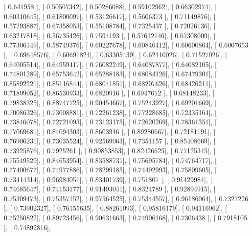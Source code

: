 \documentclass{article}
\begin{document}
       [ 0.641958  ],
       [ 0.50507342],
       [ 0.50286088],
       [ 0.59102962],
       [ 0.66302974],
       [ 0.60310645],
       [ 0.61800097],
       [ 0.53126617],
       [ 0.5606373 ],
       [ 0.71149876],
       [ 0.57293887],
       [ 0.67358053],
       [ 0.55108784],
       [ 0.7325437 ],
       [ 0.72026136],
       [ 0.63217818],
       [ 0.56735426],
       [ 0.7594193 ],
       [ 0.57612146],
       [ 0.67308009],
       [ 0.77306149],
       [ 0.58749376],
       [ 0.60227678],
       [ 0.60846412],
       [ 0.60600864],
       [ 0.6007653 ],
       [ 0.69648576],
       [ 0.60691824],
       [ 0.63305439],
       [ 0.62110026],
       [ 0.71527026],
       [ 0.64005514],
       [ 0.64959417],
       [ 0.76082249],
       [ 0.64087877],
       [ 0.64082105],
       [ 0.74801289],
       [ 0.65753642],
       [ 0.65288183],
       [ 0.68084126],
       [ 0.67479301],
       [ 0.85892221],
       [ 0.85116844],
       [ 0.68041851],
       [ 0.68207626],
       [ 0.68426211],
       [ 0.71899052],
       [ 0.86530933],
       [ 0.6820916 ],
       [ 0.6947612 ],
       [ 0.68148233],
       [ 0.79838325],
       [ 0.88747725],
       [ 0.90454667],
       [ 0.75243927],
       [ 0.69201669],
       [ 0.70086326],
       [ 0.73008881],
       [ 0.72261238],
       [ 0.77228685],
       [ 0.72335164],
       [ 0.73846078],
       [ 0.72721093],
       [ 0.73123175],
       [ 0.72620269],
       [ 0.78361351],
       [ 0.77069681],
       [ 0.84094303],
       [ 0.8603946 ],
       [ 0.89280667],
       [ 0.72181191],
       [ 0.76906231],
       [ 0.73035524],
       [ 0.92569063],
       [ 0.7351157 ],
       [ 0.85408669],
       [ 0.73925876],
       [ 0.7925261 ],
       [ 0.90853853],
       [ 0.82426625],
       [ 0.77125345],
       [ 0.75549529],
       [ 0.84653954],
       [ 0.83588731],
       [ 0.75695784],
       [ 0.74764717],
       [ 0.77400677],
       [ 0.74977886],
       [ 0.78299185],
       [ 0.74492993],
       [ 0.75809605],
       [ 0.73414314],
       [ 0.96984051],
       [ 0.83401739],
       [ 0.751807  ],
       [ 0.91429984],
       [ 0.74685647],
       [ 0.74153177],
       [ 0.91493041],
       [ 0.8324789 ],
       [ 0.92894915],
       [ 0.75309473],
       [ 0.75357152],
       [ 0.97564525],
       [ 0.75344557],
       [ 0.96186064],
       [ 0.7327226 ],
       [ 0.73902327],
       [ 0.76155635],
       [ 0.88261093],
       [ 0.95816179],
       [ 0.94116962],
       [ 0.75250822],
       [ 0.89723456],
       [ 0.90631663],
       [ 0.74906168],
       [ 0.7306438 ],
       [ 0.7918105 ],
       [ 0.74892816],
\end{document}
